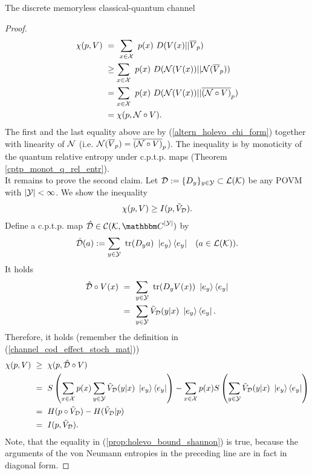 \begin{section}{The discrete memoryless  classical-quantum channel}
\begin{proof}
		\begin{align*}
		\chi(p,V) \ 
		&= \ \sum_{x \in \cX} \ p(x) \ D(V(x)||\overline{V}_p) \\
		&\geq \sum_{x \in \cX} \ p(x)\  D(\cN(V(x))||\cN(\overline{V}_p)) \\
		&= \sum_{x \in \cX} \ p(x)\  D(\cN(V(x))||\overline{(\cN\circ V)}_p) \\
		&= \chi(p, \cN \circ V).
		\end{align*}
		The first and the last equality above are by (\ref{altern_holevo_chi_form}) together with linearity of ${\mathcal N}$ (i.e. ${\mathcal N}(\overline{V}_p)= \overline{({\mathcal N}\circ V)}_p$). The inequality is by monoticity of the quantum relative entropy under c.p.t.p. maps (Theorem \ref{cptp_monot_q_rel_entr}). \\
		It remains to prove the second claim. Let ${\mathcal D} := \{D_y\}_{y \in {\mathcal Y}} \subset {\mathcal L}({\mathcal K})$ be any POVM with $|{\mathcal Y}| < \infty$. We show the inequality
		\begin{align}
		\chi(p,V) \geq I(p, \tilde{V}_{\mathcal D}).
		\end{align}
		Define a c.p.t.p. map $\hat{\cD} \in \cC(\cK, \bbmC^{|\cY|})$ by 
		\begin{align*}
		\hat{{\mathcal D}}(a) := \sum_{y \in {\mathcal Y}} \ \mathrm{tr}(D_y a) \ \ket{e_y} \bra{e_y} &&(a \in {\mathcal L}({\mathcal K})).
		\end{align*}
		It holds
		\begin{align*}
		\hat{\cD} \circ V(x)  \ 
		&= \ \sum_{y \in \cY} \ \tr(D_y V(x)) \ \ket{e_y} \bra{e_y} \\
		&= \ \sum_{y \in \cY}  \tilde{V}_{\cD}(y|x) \ \ket{e_y} \bra{e_y}.
		\end{align*}
		Therefore, it holds (remember the definition in (\ref{channel_cod_effect_stoch_mat}))
		\begin{align}
		\chi(p,V) \
		& \geq \ \chi(p, \hat{{\mathcal D}}\circ V) \nonumber \\
		& =  \ S\left(\sum_{x \in {\mathcal X}} p(x) \sum_{y \in {\mathcal Y}}  \tilde{V}_{{\mathcal D}}(y|x) \ \ket{e_y} \bra{e_y}\right) - \sum_{x \in {\mathcal X}} p(x) S\left(\sum_{y \in {\mathcal Y}}  \tilde{V}_{{\mathcal D}}(y|x) \ \ket{e_y} \bra{e_y}\right) \nonumber \\
		& = \ H(p\circ \tilde{V}_{{\mathcal D}}) - H(\tilde{V}_{{\mathcal D}}|p) \label{prop:holevo_bound_shannon}\\
		& =  \ I(p,\tilde{V}_{{\mathcal D}}). \nonumber 
		\end{align}
		Note, that the equality in (\ref{prop:holevo_bound_shannon}) is true, because the arguments of the von Neumann entropies in the preceding line are in fact in diagonal form. 

\end{proof}
\end{section}
